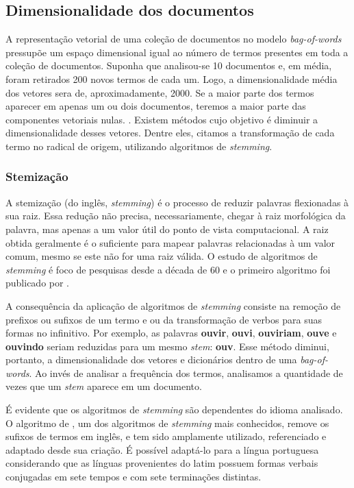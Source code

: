 \subsection{Dimensionalidade dos documentos}
\label{sub:dimensionalidade_dos_documentos}

A representação vetorial de uma coleção de documentos no modelo \textit{bag-of-words} pressupõe um espaço dimensional igual ao número de termos presentes em toda a coleção de documentos. Suponha que analisou-se 10 documentos e, em média, foram retirados 200 novos termos de cada um. Logo, a dimensionalidade média dos vetores sera de, aproximadamente, 2000. Se a maior parte dos termos aparecer em apenas um ou dois documentos, teremos a maior parte das componentes vetoriais nulas. \cite{pretext}. Existem métodos cujo objetivo é diminuir a dimensionalidade desses vetores. Dentre eles, citamos a transformação de cada termo no radical de origem, utilizando algoritmos de \textit{stemming}.

\subsubsection{Stemização}
\label{ssub:stemização}

A stemização (do inglês, \textit{stemming}) é o processo de reduzir palavras flexionadas à sua raiz. Essa redução não precisa, necessariamente, chegar à raiz morfológica da palavra, mas apenas a um valor útil do ponto de vista computacional. A raiz obtida geralmente é o suficiente para mapear palavras relacionadas à um valor comum, mesmo se este não for uma raiz válida. O estudo de algoritmos de \textit{stemming} é foco de pesquisas desde a década de 60 e o primeiro algoritmo foi publicado por .

A consequência da aplicação de algoritmos de \textit{stemming} consiste na remoção de prefixos ou sufixos de um termo e ou da transformação de verbos para suas formas no infinitivo. Por exemplo, as palavras \textbf{ouvir}, \textbf{ouvi}, \textbf{ouviriam}, \textbf{ouve} e \textbf{ouvindo} seriam reduzidas para um mesmo \textit{stem}: \textbf{ouv}. Esse método diminui, portanto, a dimensionalidade dos vetores e dicionários dentro de uma \textit{bag-of-words}. Ao invés de analisar a frequência dos termos, analisamos a quantidade de vezes que um \textit{stem} aparece em um documento.

É evidente que os algoritmos de \textit{stemming} são dependentes do idioma analisado. O algoritmo de , um dos algoritmos de \textit{stemming} mais conhecidos, remove os sufixos de termos em inglês, e tem sido amplamente utilizado, referenciado e adaptado desde sua criação. É possível adaptá-lo para a língua portuguesa considerando que as línguas provenientes do latim possuem formas verbais conjugadas em sete tempos e com sete terminações distintas.


